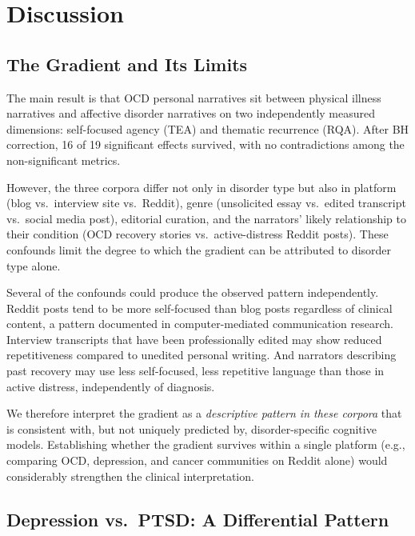 \documentclass[11pt,a4paper]{article}
\begin{document}
\section{Discussion}

\subsection{The Gradient and Its Limits}

The main result is that OCD personal narratives sit between physical illness narratives and affective disorder narratives on two independently measured dimensions: self-focused agency (TEA) and thematic recurrence (RQA). After BH correction, 16 of 19 significant effects survived, with no contradictions among the non-significant metrics.

However, the three corpora differ not only in disorder type but also in platform (blog vs.\ interview site vs.\ Reddit), genre (unsolicited essay vs.\ edited transcript vs.\ social media post), editorial curation, and the narrators' likely relationship to their condition (OCD recovery stories vs.\ active-distress Reddit posts). These confounds limit the degree to which the gradient can be attributed to disorder type alone.

Several of the confounds could produce the observed pattern independently. Reddit posts tend to be more self-focused than blog posts regardless of clinical content, a pattern documented in computer-mediated communication research. Interview transcripts that have been professionally edited may show reduced repetitiveness compared to unedited personal writing. And narrators describing past recovery may use less self-focused, less repetitive language than those in active distress, independently of diagnosis.

We therefore interpret the gradient as a \emph{descriptive pattern in these corpora} that is consistent with, but not uniquely predicted by, disorder-specific cognitive models. Establishing whether the gradient survives within a single platform (e.g., comparing OCD, depression, and cancer communities on Reddit alone) would considerably strengthen the clinical interpretation.

\subsection{Depression vs.\ PTSD: A Differential Pattern}
\end{document}
